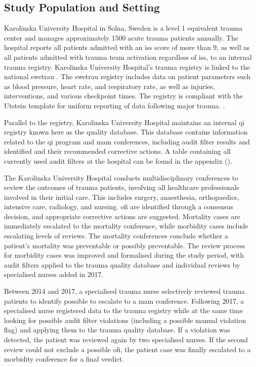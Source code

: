 \documentclass[12pt, a4paper]{article}
\begin{document}
\subsection{Study Population and Setting}
Karolinska University Hospital in Solna, Sweden is a level 1 equivalent trauma center and manages approximately 1500 acute trauma patients annually. The hospital reports all patients admitted with an \acrfull{iss} score of more than 9, as well as all patients admitted with trauma team activation regardless of \acrshort{iss}, to an internal trauma registry. Karolinska University Hospital's trauma registry is linked to the national \acrfull{swetrau} \cite{swetrau}. The \acrshort{swetrau} registry includes data on patient parameters such as blood pressure, heart rate, and respiratory rate, as well as injuries, interventions, and various checkpoint times. The registry is compliant with the Utstein template for uniform reporting of data following major trauma. \cite{ringdal_utstein_2008}.

Parallel to the registry, Karolinska University Hospital maintains an internal \acrshort{qi} registry known here as the quality database.  This database contains information related to the \acrshort{qi} program and \acrshort{mam} conferences, including audit filter results and identified  and their recommended corrective actions. A table containing all currently used audit filters at the hospital can be found in the appendix ().

The Karolinska University Hospital conducts multidisciplinary conferences to review the outcomes of trauma patients, involving all healthcare professionals involved in their initial care. This includes surgery, anaesthesia, orthopaedics, intensive care, radiology, and nursing. \acrshort{ofi} are identified through a consensus decision, and appropriate corrective actions are suggested. Mortality cases are immediately escalated to the mortality conference, while morbidity cases include escalating levels of reviews. The mortality conferences conclude whether a patient's mortality was preventable or possibly preventable. The review process for morbidity cases was improved and formalised during the study period, with audit filters applied to the trauma quality database and individual reviews by specialised nurses added in 2017.

Between 2014 and 2017, a specialised trauma nurse selectively reviewed trauma patients to identify possible  to escalate to a \acrshort{mam} conference. Following 2017, a specialised nurse registered data to the trauma registry while at the same time looking for possible audit filter violations (including a possible manual violation flag) and applying them to the trauma quality database. If a violation was detected, the patient was reviewed again by two specialised nurses. If the second review could not exclude a possible \acrshort{ofi}, the patient case was finally escalated to a morbidity conference for a final verdict.
\end{document}

